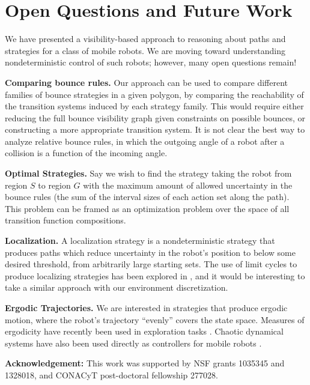 \documentclass[]{article}
\begin{document}
\section{Open Questions and Future Work}

We have presented a visibility-based approach to reasoning about 
paths and strategies for a class of mobile robots. We are moving toward
understanding nondeterministic control of such robots; however, many open
questions remain!

\textbf{Comparing bounce rules.} Our approach can be used to compare different families of
bounce strategies in a given polygon, by comparing the reachability of the
transition systems induced by each strategy family. This would require 
either reducing the full bounce visibility graph given constraints on
possible bounces, or constructing a more appropriate transition
system. It is not clear the best way to analyze relative bounce rules, in which the
outgoing angle of a robot after a collision is a function of the incoming angle.


\textbf{Optimal Strategies.} Say we wish to
find the strategy taking the robot from region $S$ to region $G$ with the
maximum amount of allowed uncertainty in the bounce rules (the sum of the
interval sizes of each action set along the path). This problem can be framed as
an optimization problem over the space of all transition function compositions.

\textbf{Localization.} A localization strategy is a nondeterministic strategy that 
produces paths which reduce uncertainty in the robot's position to below some
desired threshold, from arbitrarily large starting sets. The use of limit cycles
to produce localizing strategies has been explored in \cite{alam2018space}, and
it would be interesting to take a similar approach with our environment
discretization.

\textbf{Ergodic Trajectories.} 
We are interested in strategies that produce ergodic motion, where the robot's
trajectory ``evenly'' covers the state space. Measures
of ergodicity have recently been used in exploration tasks
\cite{miller2016ergodic}. Chaotic dynamical systems have also been used directly
as controllers for mobile robots \cite{nakamura2001chaotic}.


\textbf{Acknowledgement:} This work was supported by NSF grants 1035345 and 1328018, and CONACyT
post-doctoral fellowship 277028.




\end{document}
